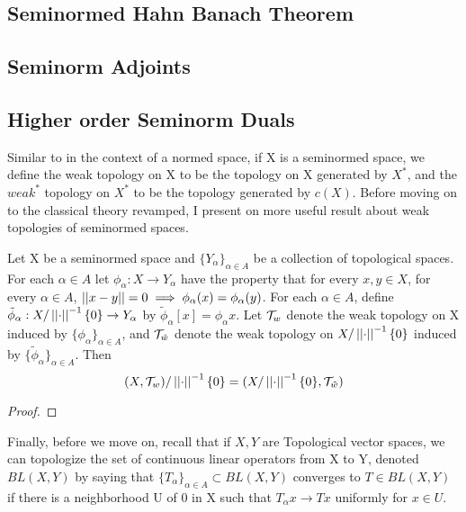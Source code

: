 \subsection{Seminormed Hahn Banach Theorem}

\subsection{Seminorm Adjoints}



\subsection{Higher order Seminorm Duals}





 Similar to in the context of a normed space, if X is a seminormed space, we define the weak topology on X to be the topology on X generated by $X^*$, and the $weak^*$ topology on $X^*$ to be the topology generated by $c(X)$.
Before moving on to the classical theory revamped, I present on more useful result about weak topologies of seminormed spaces. 
\begin{prop}
    \label{prop:weakquotients}
    Let X be a seminormed space and $\{Y_\alpha\}_{\alpha \in A}$ be a collection of topological spaces. For each $\alpha \in A$ let $\phi_\alpha:X \to Y_\alpha$ have the property that for every $x,y \in X$, for every $\alpha \in A$, $\left|\left| x-y \right|\right|=0 \implies \phi_\alpha(x)=\phi_\alpha(y)$. 
    For each $\alpha \in A$, define $\tilde{\phi}_\alpha:X/\left|\left| \cdot \right|\right|^{-1}\{0\} \to Y_\alpha$ by
    $\tilde{\phi}_{\alpha}[x] = \phi_\alpha x$. Let $\mathcal{T}_w$ denote the weak topology on X induced by $\{\phi_\alpha\}_{\alpha \in A}$, and $\mathcal{T}_{\tilde{w}}$ denote the weak topology on $X/\left|\left| \cdot \right|\right|^{-1}\{0\}$ induced by $\{\tilde{\phi}_{\alpha}\}_{\alpha \in A}$. Then 
    \begin{equation}
        (X,\mathcal{T}_w)/\left|\left| \cdot \right|\right|^{-1}\{0\} = (X/\left|\left| \cdot \right|\right|^{-1}\{0\}, \mathcal{T}_{\tilde{w}})
    \end{equation}
    \begin{proof}
    \end{proof} 
\end{prop} 


Finally, before we move on, recall that if $X,Y$ are Topological vector spaces, we can topologize the set of continuous linear operators from X to Y, denoted $BL(X,Y)$ by saying that $\{T_\alpha\}_{\alpha \in A} \subset BL(X,Y)$ converges to $T \in BL(X,Y)$ if there is a neighborhood U of 0 in X such that $T_{\alpha}x \to Tx$ uniformly for $x \in U$. 
